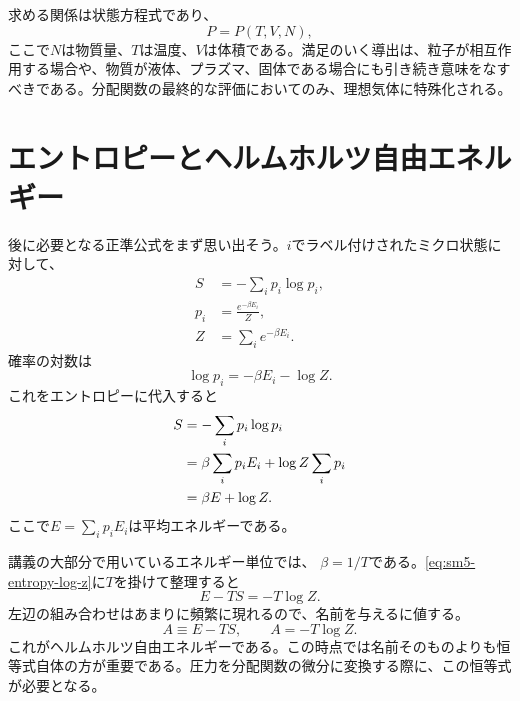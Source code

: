 求める関係は状態方程式であり、
\begin{equation}
 P=P(T,V,N),
 \label{eq:sm5-equation-of-state-target}
\end{equation}
ここで\(N\)は物質量、\(T\)は温度、\(V\)は体積である。満足のいく導出は、粒子が相互作用する場合や、物質が液体、プラズマ、固体である場合にも引き続き意味をなすべきである。分配関数の最終的な評価においてのみ、理想気体に特殊化される。

\section{エントロピーとヘルムホルツ自由エネルギー}

後に必要となる正準公式をまず思い出そう。\(i\)でラベル付けされたミクロ状態に対して、
\begin{equation}
 \begin{aligned}
 S&=-\sum_i p_i\log p_i,\\
 p_i&=\frac{e^{-\beta E_i}}{Z},\\
 Z&=\sum_i e^{-\beta E_i}.
 \end{aligned}
 \label{eq:sm5-canonical-definitions}
\end{equation}
確率の対数は
\begin{equation}
 \log p_i=-\beta E_i-\log Z.
 \label{eq:sm5-log-probability}
\end{equation}
これをエントロピーに代入すると
\begin{align}
 S
 &=-\sum_i p_i\log p_i \notag\\
 &=\beta\sum_i p_iE_i+\log Z\sum_i p_i \notag\\
 &=\beta E+\log Z.
 \label{eq:sm5-entropy-log-z}
\end{align}
ここで\(E=\sum_i p_iE_i\)は平均エネルギーである。

\begin{classroomqa}
\end{classroomqa}

講義の大部分で用いているエネルギー単位では、
\(\beta=1/T\)である。\eqref{eq:sm5-entropy-log-z}に\(T\)を掛けて整理すると
\begin{equation}
 E-TS=-T\log Z.
 \label{eq:sm5-helmholtz-identity}
\end{equation}
左辺の組み合わせはあまりに頻繁に現れるので、名前を与えるに値する。
\begin{equation}
 A\equiv E-TS,
 \qquad
 A=-T\log Z.
 \label{eq:sm5-helmholtz-definition}
\end{equation}
これがヘルムホルツ自由エネルギーである。この時点では名前そのものよりも恒等式自体の方が重要である。圧力を分配関数の微分に変換する際に、この恒等式が必要となる。

